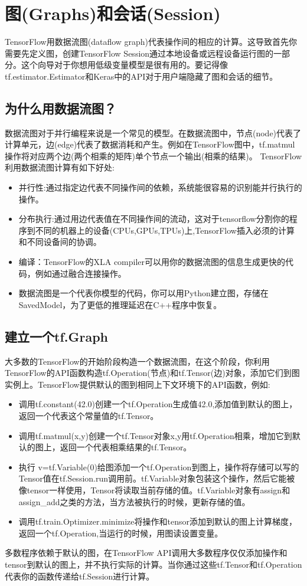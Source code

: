 \section{图(Graphs)和会话(Session)}
TensorFlow用数据流图(dataflow graph)代表操作间的相应的计算。这导致首先你需要先定义图，创建TensorFlow Session通过本地设备或远程设备运行图的一部分。这个向导对于你想用低级变量模型是很有用的。要记得像tf.estimator.Estimator和Keras中的API对于用户端隐藏了图和会话的细节。
\subsection{为什么用数据流图？}
数据流图对于并行编程来说是一个常见的模型。在数据流图中，节点(node)代表了计算单元，边(edge)代表了数据消耗和产生。例如在TensorFlow图中，tf.matmul操作将对应两个边(两个相乘的矩阵)单个节点一个输出(相乘的结果)。
TensorFlow利用数据流图计算有如下好处:
\begin{itemize}
\item 并行性:通过指定边代表不同操作间的依赖，系统能很容易的识别能并行执行的操作。
\item 分布执行:通过用边代表值在不同操作间的流动，这对于tensorflow分割你的程序到不同的机器上的设备(CPUs,GPUs,TPUs)上,TensorFlow插入必须的计算和不同设备间的协调。
\item 编译：TensorFlow的XLA compiler可以用你的数据流图的信息生成更快的代码，例如通过融合连接操作。
\item 数据流图是一个代表你模型的代码，你可以用Python建立图，存储在SavedModel，为了更低的推理延迟在C++程序中恢复。
\end{itemize}
\subsection{建立一个tf.Graph}
大多数的TensorFlow的开始阶段构造一个数据流图，在这个阶段，你利用TensorFlow的API函数构造tf.Operation(节点)和tf.Tensor(边)对象，添加它们到图实例上。TensorFlow提供默认的图到相同上下文环境下的API函数，例如:
\begin{itemize}
\item 调用tf.constant(42.0)创建一个tf.Operation生成值42.0,添加值到默认的图上，返回一个代表这个常量值的tf.Tensor。
\item 调用tf.matmul(x,y)创建一个tf.Tensor对象x,y用tf.Operation相乘，增加它到默认的图上，返回一个代表相乘结果的tf.Tensor。
\item 执行 v=tf.Variable(0)给图添加一个tf.Operation到图上，操作将存储可以写的Tensor值在tf.Session.run调用前。tf.Variable对象包装这个操作，然后它能被像tensor一样使用，Tensor将读取当前存储的值。tf.Variable对象有assign和assign\_add之类的方法，当方法被执行的时候，更新存储的值。
\item 调用tf.train.Optimizer.minimize将操作和tensor添加到默认的图上计算梯度，返回一个tf.Operation,当运行的时候，用图读设置变量。
\end{itemize}
多数程序依赖于默认的图，在TensorFlow API调用大多数程序仅仅添加操作和tensor到默认的图上，并不执行实际的计算。当你通过这些tf.Tensor和tf.Operation代表你的函数传递给tf.Session进行计算。
